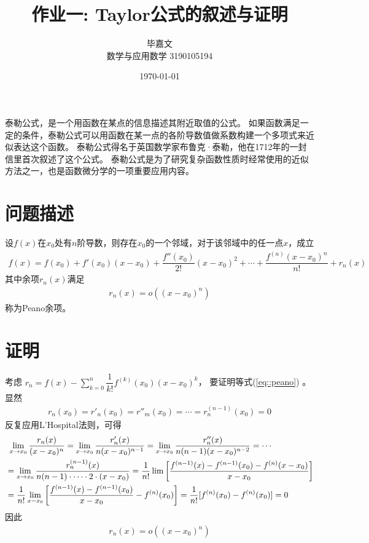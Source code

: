 \documentclass{ctexart}
\title{作业一: Taylor公式的叙述与证明}
\author{毕嘉文 \\ 数学与应用数学 3190105194}
\date{\today}
\begin{document}
\maketitle


泰勒公式，是一个用函数在某点的信息描述其附近取值的公式。
如果函数满足一定的条件，泰勒公式可以用函数在某一点的各阶导数值做系数构建一个多项式来近似表达这个函数。
泰勒公式得名于英国数学家布鲁克·泰勒，他在1712年的一封信里首次叙述了这个公式。
泰勒公式是为了研究复杂函数性质时经常使用的近似方法之一，也是函数微分学的一项重要应用内容。
\section{问题描述}
设$f(x)$在$x_0$处有$n$阶导数，则存在$x_0$的一个邻域，对于该邻域中的任一点$x$，成立\begin{align}
f(x) = f(x_0) + f'(x_0)(x-x_0) + \dfrac{f''(x_0)}{2!}(x-x_0)^2 + \cdots + \dfrac{f^{(n)}(x-x_0)^n}{n!} + r_n(x)
\label{eq::taylor}
\end{align}其中余项$r_n(x)$满足\begin{align}
r_n(x) = o((x-x_0)^n)
\label{eq::peano}
\end{align}称为Peano余项。
\section{证明}
考虑 $\displaystyle r_n = f(x) - \sum_{k=0}^n \dfrac1{k!}f^{(k)}(x_0)(x-x_0)^k $，
要证明等式(\ref{eq::peano}) 。显然\begin{align}
r_n(x_0) = r'_n(x_0) = r''_m(x_0) = \cdots = r_n^{(n-1)}(x_0) = 0
\label{pr1}
\end{align}反复应用L'Hospital法则，可得\begin{align}
&\ \lim_{x\rightarrow x_0} \dfrac{r_n(x)}{(x-x_0)^n} = \lim_{x\rightarrow x_0} \dfrac{r'_n(x)}{n(x-x_0)^{n-1}} 
	= \lim_{x\rightarrow x_0}\dfrac{r''_n(x)}{n(n-1)(x-x_0)^{n-2}} = \cdots \notag\\
&= \lim_{x\rightarrow x_0} \dfrac{r_n^{(n-1)}(x)}{n(n-1)\cdot \cdots \cdot 2\cdot (x-x_0)} = 
	\dfrac1{n!}\lim\left[ \dfrac{f^{(n-1)}(x) - f^{(n-1)}(x_0) - f^{(n)}(x-x_0)}{x-x_0} \right] \notag\\
&= \dfrac1{n!}\lim_{x-x_0}\left[ \dfrac{f^{(n-1)}(x) - f^{(n-1)}(x_0)}{x-x_0} - f^{(n)}(x_0) \right] 
	= \dfrac1{n!}[f^{(n)}(x_0) - f^{(n)}(x_0)] = 0
\label{pr2}
\end{align}
因此\begin{align}
r_n(x) = o((x-x_0)^n)
\label{pr3}
\end{align}
\end{document}
